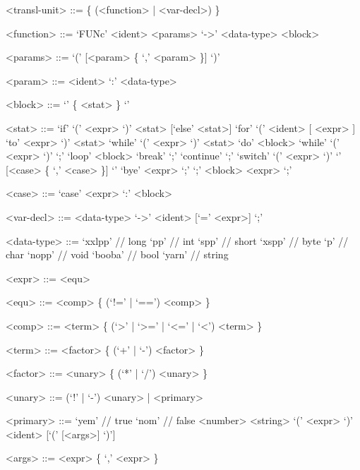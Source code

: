 \documentclass[12pt, a4paper]{article}
\begin{document}
    \setlength{\grammarparsep}{0.6em} %
    \setlength{\grammarindent}{10em} %

    \begin{grammar}

        <transl-unit> ::= \{ (<function> | <var-decl>) \}

        <function> ::= `FUNc' <ident> <params> `->' <data-type> <block>

        <params> ::= `(' [<param> \{ `,' <param> \}] `)'

        <param> ::= <ident> `:' <data-type>

        <block> ::= `{' \{ <stat> \} `}'

        <stat> ::= `if' `(' <expr> `)' <stat> [`else' <stat>]
        \alt `for' `(' <ident> [ <expr> ] `to' <expr> `)' <stat>
        \alt `while' `(' <expr> `)' <stat>
        \alt `do' <block> `while' `(' <expr> `)' `;'
        \alt `loop' <block>
        \alt `break' `;'
        \alt `continue' `;'
        \alt `switch' `(' <expr> `)' `{' [<case> \{ `,' <case> \}] `}'
        \alt `bye' <expr> `;'
        \alt `;'
        \alt <block>
        \alt <expr> `;'

        <case> ::= `case' <expr> `:' <block>

        <var-decl> ::= <data-type> `->' <ident> [`=' <expr>] `;'

        <data-type> ::= `xxlpp' // long
        \alt `pp' // int
        \alt `spp' // short
        \alt `xspp' // byte
        \alt `p' // char
        \alt `nopp' // void
        \alt `booba' // bool
        \alt `yarn' // string

        <expr> ::= <equ>

        <equ> ::= <comp> \{ (`!=' | `==') <comp> \}

        <comp> ::= <term> \{ (`>' | `>=' | `<=' | `<') <term> \}

        <term> ::= <factor> \{ (`+' | `-') <factor> \}

        <factor> ::= <unary> \{ (`*' | `/') <unary> \}

        <unary> ::= (`!' | `-') <unary> | <primary>

        <primary> ::= `yem' // true
        \alt `nom' // false
        \alt <number>
        \alt <string>
        \alt `(' <expr> `)'
        \alt <ident> [`(' [<args>] `)']

        <args> ::= <expr> \{ `,' <expr> \}
    \end{grammar}
\end{document}
